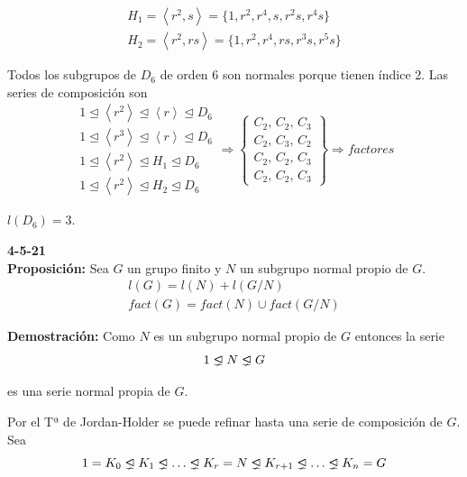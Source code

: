 \documentclass{article}
\newcommand{\unlhdneq}{%
  \mathrel{\ooalign{$\lneq$\cr\raise.22ex\hbox{$\lhd$}\cr}}}
\begin{document}
\begin{enumerate}[1)]
\begin{gather*}
H_1=\left\langle r^2,s\right\rangle=\{1,r^2,r^4,s,r^2s,r^4s\}\\
H_2=\left\langle r^2,rs\right\rangle =\{1,r^2, r^4,rs,r^3s,r^5s\}
\end{gather*}

Todos los subgrupos de $D_6$ de orden 6 son normales porque tienen índice 2. Las series de composición son
\begin{equation*}
\left. \begin{array}{c}
1\unlhd \left\langle r^2\right\rangle \unlhd \left\langle r\right\rangle \unlhd D_6 \\
1\unlhd \left\langle r^3\right\rangle \unlhd \left\langle r \right\rangle \unlhd D_6 \\
1\unlhd \left\langle r^2\right\rangle \unlhd H_1\unlhd D_6 \\
1\unlhd \left\langle r^2\right\rangle \unlhd H_2\unlhd D_6
\end{array}\right. 
\Rightarrow \left\lbrace \begin{array}{c}
C_2,\,C_2,\,C_3\\
C_2,\,C_3,\,C_2\\
C_2,\,C_2,\,C_3\\
C_2,\,C_2,\,C_3
\end{array} \right\rbrace \Rightarrow factores
\end{equation*}

$l(D_6)=3$.
\end{enumerate}

\textbf{4-5-21} \\

\textbf{Proposición:} Sea $G$ un grupo finito y $N$ un subgrupo normal propio de $G$.
\begin{gather*}
l(G)=l(N)+l(G/N) \\
fact(G)=fact(N)\cup fact(G/N)
\end{gather*}

\textbf{Demostración:} Como $N$ es un subgrupo normal propio de $G$ entonces la serie
\begin{equation*}
1\unlhdneq N\unlhdneq G
\end{equation*}

es una serie normal propia de $G$.

Por el Tª de Jordan-Holder se puede refinar hasta una serie de composición de $G$. Sea
\begin{equation*}
1=K_0\unlhdneq K_1\unlhdneq \ldots \unlhdneq K_r=N\unlhdneq K_{r+1}\unlhdneq \ldots \unlhdneq K_n=G
\end{equation*}
\end{document}
